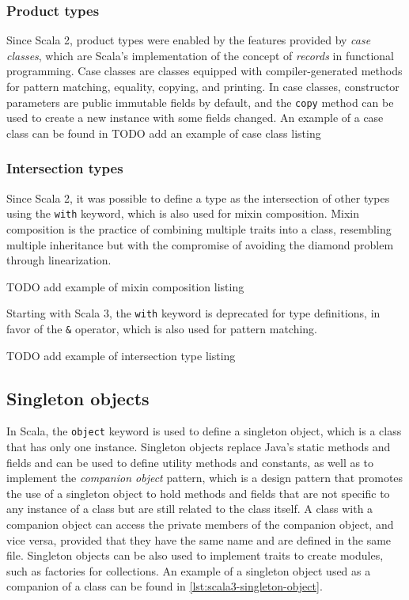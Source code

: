 \subsubsection{Product types}

Since Scala 2, product types were enabled by the features provided by \textit{case classes}, which are Scala's implementation of the concept of \textit{records} in functional programming.
%
Case classes are classes equipped with compiler-generated methods for pattern matching, equality, copying, and printing.
%
In case classes, constructor parameters are public immutable fields by default, and the \texttt{copy} method can be used to create a new instance with some fields changed.
%
An example of a case class can be found in 
TODO add an example of case class listing

\subsubsection{Intersection types}

Since Scala 2, it was possible to define a type as the intersection of other types using the \texttt{with} keyword, which is also used for mixin composition.
%
Mixin composition is the practice of combining multiple traits into a class, resembling multiple inheritance but with the compromise of avoiding the diamond problem through linearization\cite{scala-patterns}.

TODO add example of mixin composition listing

Starting with Scala 3, the \texttt{with} keyword is deprecated for type definitions, in favor of the \texttt{\&} operator, which is also used for pattern matching.

TODO add example of intersection type listing


\subsection{Singleton objects} \label{chap:background->sec:scala3->subsec:singleton-objects}

In Scala, the \texttt{object} keyword is used to define a singleton object, which is a class that has only one instance.
%
Singleton objects replace Java's static methods and fields and can be used to define utility methods and constants, as well as to implement the \textit{companion object} pattern, which is a design pattern that promotes the use of a singleton object to hold methods and fields that are not specific to any instance of a class but are still related to the class itself.
%
A class with a companion object can access the private members of the companion object, and vice versa, provided that they have the same name and are defined in the same file.
%
Singleton objects can be also used to implement traits to create modules, such as factories for collections.
%
An example of a singleton object used as a companion of a class can be found in \cref{lst:scala3-singleton-object}.

